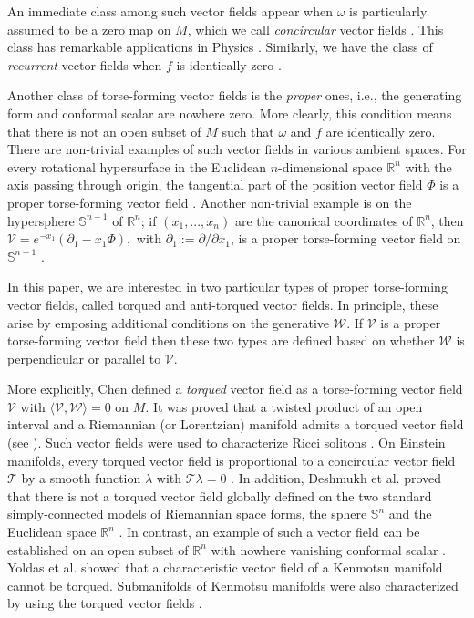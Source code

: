 \documentclass[12pt]{amsart}
\def\r{\mathbb R}
\def\s{\mathbb S}
\theoremstyle{definition}
\begin{document}
An immediate class among such vector fields appear when $\omega$ is particularly assumed to be a zero map on $M$, which we call {\it concircular} vector fields \cite{s0,ya1}. This class has remarkable applications in Physics \cite{c0,dr,mam0,mam1,mam2,mam3}. Similarly, we have the class of {\it recurrent} vector fields when $f$ is identically zero \cite{cv}.

Another class of torse-forming vector fields is the {\it proper} ones, i.e., the generating form and conformal scalar are nowhere zero. More clearly, this condition means that there is not an open subset of $M$ such that $\omega$ and $f$ are identically zero. There are non-trivial examples of such vector fields in various ambient spaces. For every rotational hypersurface in the Euclidean $n$-dimensional space $\r^n$ with the axis passing through origin, the tangential part of the position vector field $\Phi$ is a proper torse-forming vector field \cite{c00}. Another non-trivial example is on the hypersphere $\s^{n-1}$ of $\r^n$; if $(x_1,...,x_n)$ are the canonical coordinates of $\r^n$, then $\mathcal{V}=e^{-x_1}(\partial_1  - x_1\Phi),$ with $\partial_1:=\partial/\partial x_1$, is a proper torse-forming vector field on $\s^{n-1}$ \cite{id}.

In this paper, we are interested in two particular types of proper torse-forming vector fields, called torqued and anti-torqued vector fields. In principle, these arise by emposing additional conditions on the generative $\mathcal{W}$. If $\mathcal{V}$ is a proper torse-forming vector field then these two types are defined based on whether $\mathcal{W}$ is perpendicular or parallel to $\mathcal{V}$. 

More explicitly, Chen \cite{crs3} defined a {\it torqued} vector field as a torse-forming vector field $\mathcal{V}$ with $\langle \mathcal{V}, \mathcal{W}\rangle =0$ on $M$. It was proved that a twisted product of an open interval and a Riemannian (or Lorentzian) manifold admits a torqued vector field (see \cite{crs3}). Such vector fields were used to characterize Ricci solitons \cite{c01}. On Einstein manifolds, every torqued vector field is proportional to a concircular vector field $\mathcal{T}$ by a smooth function $\lambda$ with $\mathcal{T}\lambda =0$ \cite{c01}. In addition, Deshmukh et al. proved that there is not a torqued vector field globally defined on the two standard simply-connected models of Riemannian space forms, the sphere $\s^n$ and the Euclidean space $\r^n$ \cite{dta}. In contrast, an example of such a vector field can be established on an open subset of $\r^n$ with nowhere vanishing conformal scalar \cite{dta}. Yoldas et al. \cite{yms} showed that a characteristic vector field of a Kenmotsu manifold cannot be torqued. Submanifolds of Kenmotsu manifolds were also characterized by using the torqued vector fields \cite{yms}.
\end{document}
